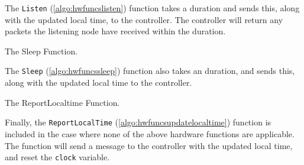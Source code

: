 The \texttt{Listen} (\autoref{algo:hwfuncslisten}) function takes a duration and sends this, along with the updated local time, to the controller. The controller will return any packets the listening node have received within the duration.\medbreak

\begin{algorithm}[ht]
    \DontPrintSemicolon
    
    
    \caption{The Sleep Function.}
    \label{algo:hwfuncssleep}
\end{algorithm}

The \texttt{Sleep} (\autoref{algo:hwfuncssleep}) function also takes an duration, and sends this, along with the updated local time to the controller.\medbreak

\begin{algorithm}[ht]
    \DontPrintSemicolon
    
    
    \caption{The ReportLocaltime Function.}
    \label{algo:hwfuncsupdatelocaltime}
\end{algorithm}

Finally, the \texttt{ReportLocalTime} (\autoref{algo:hwfuncsupdatelocaltime}) function is included in the case where none of the above hardware functions are applicable. The function will send a message to the controller with the updated local time, and reset the \texttt{clock} variable.